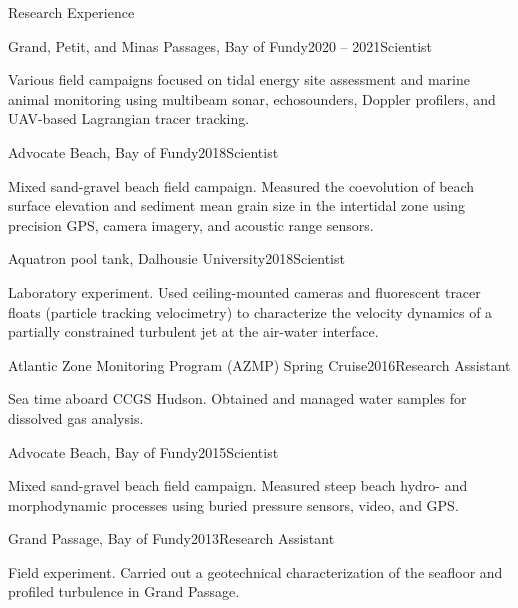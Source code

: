 \documentclass{resume} %
\begin{document}
\begin{rSection}{Research Experience}

	\begin{rSubsection}{Grand, Petit, and Minas Passages, Bay of Fundy}{2020 -- 2021}{Scientist}{}
		\item Various field campaigns focused on tidal energy site assessment and marine animal monitoring using multibeam sonar, echosounders, Doppler profilers, and UAV-based Lagrangian tracer tracking.   
	\end{rSubsection}
	
	\begin{rSubsection}{Advocate Beach, Bay of Fundy}{2018}{Scientist}{}
		\item Mixed sand-gravel beach field campaign. Measured the coevolution of beach surface elevation and sediment mean grain size in the intertidal zone using precision GPS, camera imagery, and acoustic range sensors.
	\end{rSubsection}
		
	\begin{rSubsection}{Aquatron pool tank, Dalhousie University}{2018}{Scientist}{}
		\item Laboratory experiment. Used ceiling-mounted cameras and fluorescent tracer floats (particle tracking velocimetry) to characterize the velocity dynamics of a partially constrained turbulent jet at the air-water interface.
	\end{rSubsection}
	
	\begin{rSubsection}{Atlantic Zone Monitoring Program (AZMP) Spring Cruise}{2016}{Research Assistant}{}
		\item Sea time aboard CCGS Hudson. Obtained and managed water samples for dissolved gas analysis.
	\end{rSubsection}
	
	\begin{rSubsection}{Advocate Beach, Bay of Fundy}{2015}{Scientist}{}
		\item Mixed sand-gravel beach field campaign. Measured steep beach hydro- and morphodynamic processes using buried pressure sensors, video, and GPS.
	\end{rSubsection}
	
	\begin{rSubsection}{Grand Passage, Bay of Fundy}{2013}{Research Assistant}{}
		\item Field experiment. Carried out a geotechnical characterization of the seafloor and profiled turbulence in Grand Passage.
	\end{rSubsection}


\end{rSection}
\end{document}
